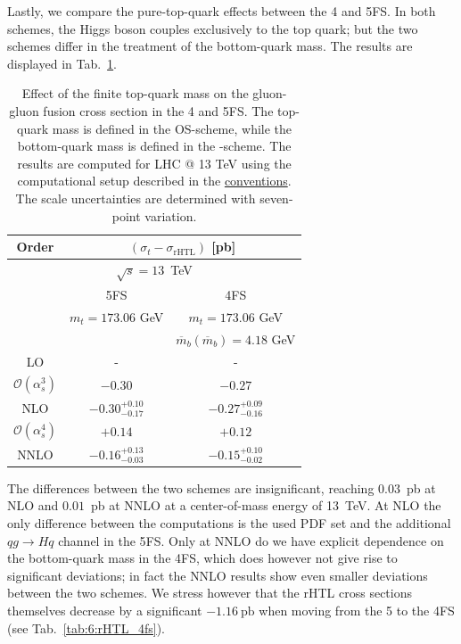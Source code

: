 Lastly, we compare the pure-top-quark effects between the 4 and 5\acs{FS}. In both schemes, the Higgs boson couples exclusively to the top quark; but the two schemes differ in the treatment of the bottom-quark mass. The results are displayed in Tab.~\ref{tab:6:t-rHTL_4vs5FS}.
\begin{table}[t]
\centering
\begin{tabular}{ccc}
  \hline
  Order & \multicolumn{2}{c}{$(\sigma_{t} - \sigma_\text{rHTL})$ [pb]} \\
  \hline
  \hline
  \multicolumn{3}{c}{$\sqrt{s}=13$~TeV} \\
  \hline
  & 5FS & 4FS \\
  & $m_t = 173.06$ GeV &  $m_t = 173.06$ GeV \\
  & & $\overline{m}_b(\overline{m}_b)=4.18$ GeV\\
  \hline
  LO & - & - \\
  \hline
  $\mathcal{O}(\alpha_s^3)$ & $-0.30$  &  $-0.27$ \\
  NLO & $-0.30^{+0.10}_{-0.17}$ & $-0.27^{+0.09}_{-0.16}$ \\
  \hline
  $\mathcal{O}(\alpha_s^4)$ & $+0.14$ & $+0.12$ \\
  NNLO & $-0.16^{+0.13}_{-0.03}$ & $-0.15^{+0.10}_{-0.02}$\\
  \hline
  \end{tabular}
\caption{Effect of the finite top-quark mass on the gluon-gluon fusion cross section in the 4 and 5\acs{FS}. The top-quark mass is defined in the \acs{OS}-scheme, while the bottom-quark mass is defined in the \MS-scheme. The results are computed for LHC @ 13 TeV using the computational setup described in the \hyperref[chap:notation_and_conventions]{conventions}. The scale uncertainties are determined with seven-point variation.}
\label{tab:6:t-rHTL_4vs5FS}
\end{table}
The differences between the two schemes are insignificant, reaching $0.03$~pb at \acs{NLO} and $0.01$~pb at \acs{NNLO} at a center-of-mass energy of 13~TeV. At \acs{NLO} the only difference between the computations is the used \acs{PDF} set and the additional $qg \longrightarrow Hq$ channel in the 5\acs{FS}. Only at \acs{NNLO} do we have explicit dependence on the bottom-quark mass in the 4\acs{FS}, which does however not give rise to significant deviations; in fact the \acs{NNLO} results show even smaller deviations between the two schemes. We stress however that the \acs{rHTL} cross sections themselves decrease by a significant $-1.16\ \mathrm{pb}$ when moving from the 5 to the 4\acs{FS} (see Tab.~\ref{tab:6:rHTL_4fs}).

